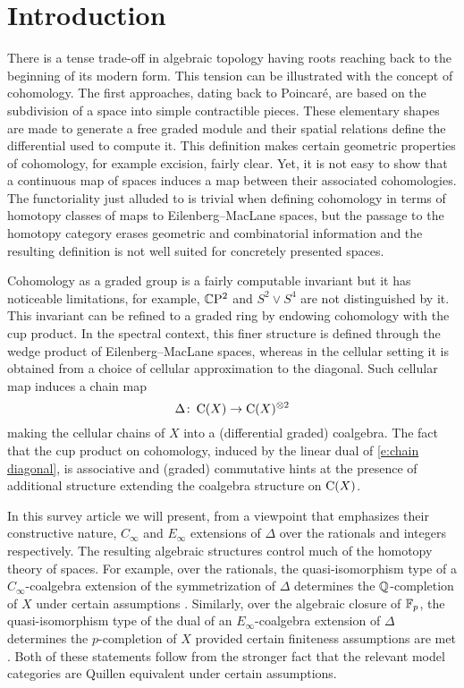 
\section{Introduction} \label{s:introduction}

There is a tense trade-off in algebraic topology having roots reaching back to the beginning of its modern form.
This tension can be illustrated with the concept of cohomology.
The first approaches, dating back to Poincar\'e, are based on the subdivision of a space into simple contractible pieces.
These elementary shapes are made to generate a free graded module and their spatial relations define the differential used to compute it.
This definition makes certain geometric properties of cohomology, for example excision, fairly clear.
Yet, it is not easy to show that a continuous map of spaces induces a map between their associated cohomologies.
The functoriality just alluded to is trivial when defining cohomology in terms of homotopy classes of maps to Eilenberg--MacLane spaces, but the passage to the homotopy category erases geometric and combinatorial information and the resulting definition is not well suited for concretely presented spaces.

Cohomology as a graded group is a fairly computable invariant but it has noticeable limitations, for example, $\mathbb{C} \mathrm{P}^2$ and $S^2 \vee S^4$ are not distinguished by it.
This invariant can be refined to a graded ring by endowing cohomology with the cup product.
In the spectral context, this finer structure is defined through the wedge product of Eilenberg--MacLane spaces, whereas in the cellular setting it is obtained from a choice of
cellular approximation to the diagonal.
Such cellular map induces a chain map
\begin{equation} \label{e:chain diagonal}
\Delta \colon \operatorname{C}(X) \to \operatorname{C}(X)^{\otimes 2}
\end{equation}
making the cellular chains of $X$ into a (differential graded) coalgebra.
The fact that the cup product on cohomology, induced by the linear dual of \eqref{e:chain diagonal}, is associative and (graded) commutative hints at the presence of additional structure extending the coalgebra structure on $\operatorname{C}(X)$.

In this survey article we will present, from a viewpoint that emphasizes their constructive nature, $C_\infty$ and $E_\infty$ extensions of $\Delta$ over the rationals and integers respectively.
The resulting algebraic structures control much of the homotopy theory of spaces.
For example, over the rationals, the quasi-isomorphism type of a $C_\infty$-coalgebra extension of the symmetrization of $\Delta$ determines the $\mathbb{Q}$-completion of $X$ under certain assumptions \cite{quillen1969rational, buijs2020liemodels}.
Similarly, over the algebraic closure of ${\mathbb{F}_p}$, the quasi-isomorphism type of the dual of an $E_\infty$-coalgebra extension of $\Delta$ determines the $p$-completion of $X$ provided certain finiteness assumptions are met \cite{mandell2001padic}.
Both of these statements follow from the stronger fact that the relevant model categories are Quillen equivalent under certain assumptions.

